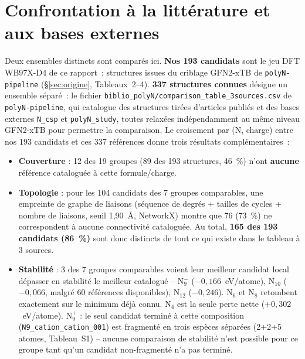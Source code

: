 \documentclass[11pt,a4paper]{article}
\begin{document}


\section{Confrontation \`a la litt\'erature et aux bases externes}
\label{sec:litterature}

Deux ensembles distincts sont compar\'es ici. \textbf{Nos 193 candidats}
sont le jeu DFT WB97X-D4 de ce rapport~: structures issues du criblage
GFN2-xTB de \texttt{polyN-pipeline} (§\ref{sec:origine}, Tableaux~2--4).
\textbf{337 structures connues} d\'esigne un ensemble s\'epar\'e~: le
fichier \texttt{biblio\_polyN/comparison\_table\_3sources.csv} de
\texttt{polyN-pipeline}, qui catalogue des structures tir\'ees d'articles
publi\'es et des bases externes \texttt{N\_csp} et \texttt{polyN\_study},
toutes relax\'ees ind\'ependamment au m\^eme niveau GFN2-xTB pour permettre
la comparaison. Le croisement par (N, charge) entre nos 193 candidats et
ces 337 r\'ef\'erences donne trois r\'esultats compl\'ementaires~:

\begin{itemize}[leftmargin=1.4em]
  \item \textbf{Couverture} : 12 des 19 groupes (89 des 193 structures,
  46~\%) n'ont \textbf{aucune} r\'ef\'erence catalogu\'ee \`a cette
  formule/charge.
  \item \textbf{Topologie} : pour les 104 candidats des 7 groupes
  comparables, une empreinte de graphe de liaisons (s\'equence de degr\'es
  + tailles de cycles + nombre de liaisons, seuil 1,90~\AA, NetworkX)
  montre que 76 (73~\%) ne correspondent \`a aucune connectivit\'e
  catalogu\'ee. Au total, \textbf{165 des 193 candidats (86~\%)} sont donc
  distincts de tout ce qui existe dans le tableau \`a 3 sources.
  \item \textbf{Stabilit\'e} : 3 des 7 groupes comparables voient leur
  meilleur candidat local d\'epasser en stabilit\'e le meilleur catalogu\'e
  -- N$_9^-$ ($-0{,}166$~eV/atome), N$_{10}$ ($-0{,}066$, malgr\'e 60
  r\'ef\'erences disponibles), N$_{12}$ ($-0{,}246$). N$_6$ et N$_8$
  retombent exactement sur le minimum d\'ej\`a connu. N$_4$ est la seule
  perte nette ($+0{,}302$~eV/atome).
  N$_9^+$ : le seul candidat termin\'e \`a cette composition
  (\texttt{N9\_cation\_cation\_001}) est fragment\'e en trois esp\`eces
  s\'epar\'ees (2+2+5 atomes, Tableau~S1) -- aucune comparaison de
  stabilit\'e n'est possible pour ce groupe tant qu'un candidat
  non-fragment\'e n'a pas termin\'e.
\end{itemize}
\end{document}
